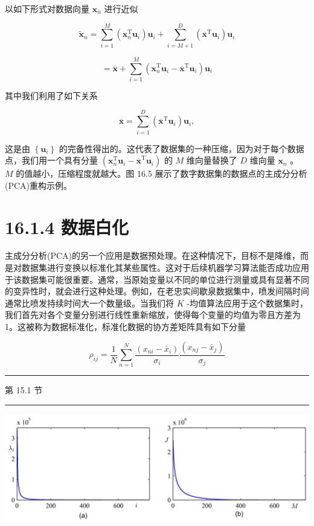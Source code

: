 \documentclass[10pt]{article}
\newcommand{\HRule}{\begin{center}\rule{0.9\linewidth}{0.2mm}\end{center}}
\begin{document}
以如下形式对数据向量 \({\mathbf{x}}_{n}\) 进行近似

\[
{\widetilde{\mathbf{x}}}_{n} = \mathop{\sum }\limits_{{i = 1}}^{M}\left( {{\mathbf{x}}_{n}^{\mathrm{T}}{\mathbf{u}}_{i}}\right) {\mathbf{u}}_{i} + \mathop{\sum }\limits_{{i = M + 1}}^{D}\left( {{\overline{\mathbf{x}}}^{\mathrm{T}}{\mathbf{u}}_{i}}\right) {\mathbf{u}}_{i} \tag{16.19}
\]

\[
= \overline{\mathbf{x}} + \mathop{\sum }\limits_{{i = 1}}^{M}\left( {{\mathbf{x}}_{n}^{\mathrm{T}}{\mathbf{u}}_{i} - {\overline{\mathbf{x}}}^{\mathrm{T}}{\mathbf{u}}_{i}}\right) {\mathbf{u}}_{i} \tag{16.20}
\]

其中我们利用了如下关系

\[
\overline{\mathbf{x}} = \mathop{\sum }\limits_{{i = 1}}^{D}\left( {{\overline{\mathbf{x}}}^{\mathrm{T}}{\mathbf{u}}_{i}}\right) {\mathbf{u}}_{i}, \tag{16.21}
\]

这是由 \(\left\{  {\mathbf{u}}_{i}\right\}\) 的完备性得出的。这代表了数据集的一种压缩，因为对于每个数据点，我们用一个具有分量 \(\left( {{\mathbf{x}}_{n}^{\mathrm{T}}{\mathbf{u}}_{i} - {\overline{\mathbf{x}}}^{\mathrm{T}}{\mathbf{u}}_{i}}\right)\) 的 \(M\) 维向量替换了 \(D\) 维向量 \({\mathbf{x}}_{n}\) 。 \(M\) 的值越小，压缩程度就越大。图 16.5 展示了数字数据集的数据点的主成分分析(PCA)重构示例。

\section*{16.1.4 数据白化}

主成分分析(PCA)的另一个应用是数据预处理。在这种情况下，目标不是降维，而是对数据集进行变换以标准化其某些属性。这对于后续机器学习算法能否成功应用于该数据集可能很重要。通常，当原始变量以不同的单位进行测量或具有显著不同的变异性时，就会进行这种处理。例如，在老忠实间歇泉数据集中，喷发间隔时间通常比喷发持续时间大一个数量级。当我们将 \(K\) -均值算法应用于这个数据集时，我们首先对各个变量分别进行线性重新缩放，使得每个变量的均值为零且方差为 1。这被称为数据标准化，标准化数据的协方差矩阵具有如下分量

\[
{\rho }_{ij} = \frac{1}{N}\mathop{\sum }\limits_{{n = 1}}^{N}\frac{\left( {x}_{ni} - {\bar{x}}_{i}\right) }{{\sigma }_{i}}\frac{\left( {x}_{nj} - {\bar{x}}_{j}\right) }{{\sigma }_{j}} \tag{16.22}
\]

\HRule

第 15.1 节

\HRule

\begin{center}
\includegraphics[max width=1.0\textwidth]{images/0194e279-9b28-703a-88f4-c3ac21e2010d_522_286_378_1258_445_0.jpg}
\end{center}
\hspace*{3em} 
\end{document}

